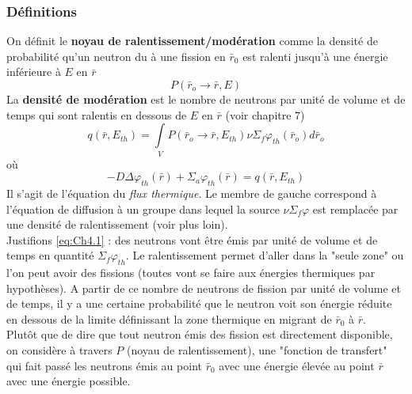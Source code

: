 \subsubsection{Définitions}
On définit le \textbf{noyau de ralentissement/modération} comme la densité de probabilité qu'un
neutron du à une fission en $\bar r_0$ est ralenti jusqu'à une énergie inférieure à $E$ en $\bar r$
\begin{equation}
P({\bar r_o} \to \bar r,E)
\end{equation}
La \textbf{densité de modération} est le nombre de neutrons par unité de volume et de temps qui sont 
ralentis en dessous de $E$ en $\bar r$ (voir chapitre 7)
\begin{equation}
q(\bar r,{E_{th}}) = \int\limits_V   P({\bar r_o} \to \bar r,{E_{th}})\nu {\Sigma _f}{\varphi _{th}}({\bar r_o})d{\bar r_o}
\label{eq:Ch4.1}
\end{equation}
où 
\begin{equation}
-D\Delta {\varphi _{th}}(\bar r) + {\Sigma _a}{\varphi _{th}}(\bar r) = q(\bar r,{E_{th}})
\end{equation}
Il s'agit de l'équation du \textit{flux thermique}. Le membre de gauche correspond à l'équation de 
diffusion à un groupe dans lequel la source $\nu\Sigma_f\varphi$ est remplacée par une densité 
de ralentissement (voir plus loin).\\
Justifions \eqref{eq:Ch4.1} : des neutrons vont être émis par unité de volume et de temps en quantité 
$\Sigma_f\varphi_{th}$. Le ralentissement permet d'aller dans la "seule zone" ou l'on peut avoir 
des fissions (toutes vont se faire aux énergies thermiques par hypothèses). A partir de ce nombre de
neutrons de fission par unité de volume et de temps, il y a une certaine probabilité que le neutron 
voit son énergie réduite en dessous de la limite définissant la zone thermique en migrant de $\bar 
r_0$ à $\bar r$.\\

Plutôt que de dire que tout neutron émis des fission est directement disponible, on considère à 
travers $P$ (noyau de ralentissement), une "fonction de transfert" qui fait passé les neutrons 
émis au point $\bar r_0$ avec une énergie élevée au point $\bar r$ avec une énergie possible.\\

